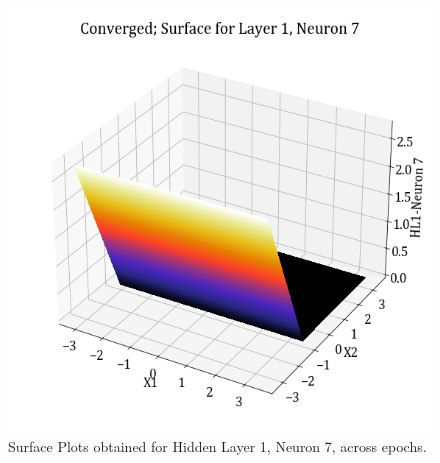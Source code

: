 \documentclass[11pt,a4paper]{article}
\begin{document}
\begin{figure}[H]
    \includegraphics[scale=0.4]{images/1B_MLFFNN_conv_HL1_N7.png}
    \caption{Surface Plots obtained for Hidden Layer 1, Neuron 7, across epochs.}
\end{figure}
\end{document}
